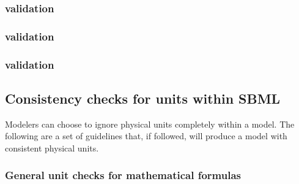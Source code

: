 \begin{sbmlenum}

\end{sbmlenum} \subsubsection*{ validation} \begin{sbmlenum}



\end{sbmlenum} \subsubsection*{ validation} \begin{sbmlenum}


\end{sbmlenum} \subsubsection*{ validation} \begin{sbmlenum}



\end{sbmlenum} 

\subsection{Consistency checks for units within SBML}

Modelers can choose to ignore physical units completely 
within a model.  The following are a set of guidelines that,
if followed, will produce a model with consistent physical units.

\subsubsection*{General unit checks for mathematical formulas} \begin{sbmlenum}


\end{sbmlenum} 

